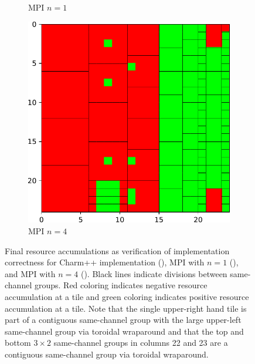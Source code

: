 \begin{figure}
\begin{subfigure}[b]{0.33\textwidth}
\caption{
MPI $n=1$
}
\label{fig:mpi_n1_correctness}
\end{subfigure}%
\begin{subfigure}[b]{0.33\textwidth}
  \includegraphics[width=\textwidth]{img/MPI-n4-correctness}
\caption{
MPI $n=4$
}
\label{fig:mpi_n4_correctness}
\end{subfigure}
\caption{
Final resource accumulations as verification of implementation correctness for Charm++ implementation (), MPI with $n=1$ (), and MPI with $n=4$ ().
Black lines indicate divisions between same-channel groups.
Red coloring indicates negative resource accumulation at a tile and green coloring indicates positive resource accumulation at a tile.
Note that the single upper-right hand tile is part of a contiguous same-channel group with the large upper-left same-channel group via toroidal wraparound and that the top and bottom $3 \times 2$ same-channel groups in columns 22 and 23 are a contiguous same-channel group via toroidal wraparound.
}
\label{fig:correctness}
\end{figure}
